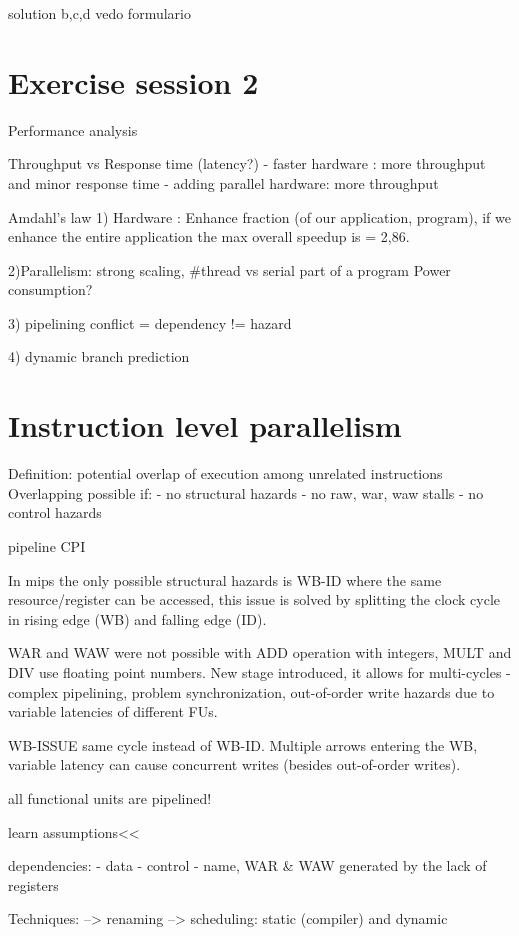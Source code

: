 solution b,c,d vedo formulario


\section{Exercise session 2}\label{sec:exercise-session-2}
Performance analysis

Throughput vs Response time (latency?)
- faster hardware : more throughput and minor response time
- adding parallel hardware: more throughput

Amdahl's law
1) Hardware : Enhance fraction (of our application, program), if we enhance the entire application the max overall
speedup is = 2,86.

2)Parallelism: strong scaling, #thread vs serial part of a program
Power consumption?

3) pipelining
conflict = dependency != hazard

4) dynamic branch prediction


\section{Instruction level parallelism}\label{sec:instruction-level-parallelism}
Definition: potential overlap of execution among unrelated instructions
Overlapping possible if:
- no structural hazards
- no raw, war, waw stalls
- no control hazards

pipeline CPI

In mips the only possible structural hazards is WB-ID where the same resource/register can be accessed,
this issue is solved by splitting the clock cycle in rising edge (WB) and falling edge (ID).

WAR and WAW were not possible with ADD operation with integers, MULT and DIV use floating point numbers.
New stage introduced, it allows for multi-cycles - complex pipelining, problem synchronization, out-of-order write
hazards due to variable latencies of different FUs.

WB-ISSUE same cycle instead of WB-ID\@.
Multiple arrows entering the WB, variable latency can cause concurrent writes (besides out-of-order writes).

all functional units are pipelined!

learn assumptions<<

dependencies:
- data
- control
- name, WAR & WAW generated by the lack of registers

Techniques:
--> renaming
--> scheduling: static (compiler) and dynamic

